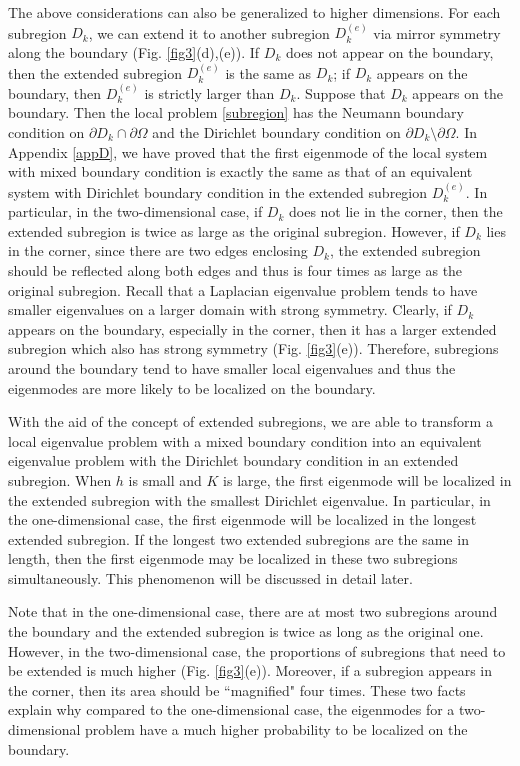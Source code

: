 \documentclass[a4paper,11pt]{article}
\begin{document}
The above considerations can also be generalized to higher dimensions. For each subregion $D_k$, we can extend it to another subregion $D_k^{(e)}$ via mirror symmetry along the boundary (Fig. \ref{fig3}(d),(e)). If $D_k$ does not appear on the boundary, then the extended subregion $D_k^{(e)}$ is the same as $D_k$; if $D_k$ appears on the boundary, then $D_k^{(e)}$ is strictly larger than $D_k$. Suppose that $D_k$ appears on the boundary. Then the local problem \eqref{subregion} has the Neumann boundary condition on $\partial D_k \cap \partial \Omega$ and the Dirichlet boundary condition on $\partial D_k \setminus \partial \Omega$. In Appendix \ref{appD}, we have proved that the first eigenmode of the local system with mixed boundary condition is exactly the same as that of an equivalent system with Dirichlet boundary condition in the extended subregion $D_k^{(e)}$. In particular, in the two-dimensional case, if $D_k$ does not lie in the corner, then the extended subregion is twice as large as the original subregion. However, if $D_k$ lies in the corner, since there are two edges enclosing $D_k$, the extended subregion should be reflected along both edges and thus is four times as large as the original subregion. Recall that a Laplacian eigenvalue problem tends to have smaller eigenvalues on a larger domain with strong symmetry. Clearly, if $D_k$ appears on the boundary, especially in the corner, then it has a larger extended subregion which also has strong symmetry (Fig. \ref{fig3}(e)). Therefore, subregions around the boundary tend to have smaller local eigenvalues and thus the eigenmodes are more likely to be localized on the boundary.

With the aid of the concept of extended subregions, we are able to transform a local eigenvalue problem with a mixed boundary condition into an equivalent eigenvalue problem with the Dirichlet boundary condition in an extended subregion. When $h$ is small and $K$ is large, the first eigenmode will be localized in the extended subregion with the smallest Dirichlet eigenvalue. In particular, in the one-dimensional case, the first eigenmode will be localized in the longest extended subregion. If the longest two extended subregions are the same in length, then the first eigenmode may be localized in these two subregions simultaneously. This phenomenon will be discussed in detail later.

Note that in the one-dimensional case, there are at most two subregions around the boundary and the extended subregion is twice as long as the original one. However, in the two-dimensional case, the proportions of subregions that need to be extended is much higher (Fig. \ref{fig3}(e)). Moreover, if a subregion appears in the corner, then its area should be ``magnified" four times. These two facts explain why compared to the one-dimensional case, the eigenmodes for a two-dimensional problem have a much higher probability to be localized on the boundary.
\end{document}
